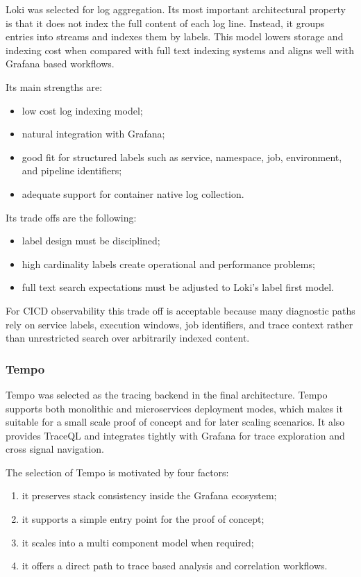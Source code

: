 Loki was selected for log aggregation. Its most important architectural property is that it does not index the full content of each log line. Instead, it groups entries into streams and indexes them by labels. This model lowers storage and indexing cost when compared with full text indexing systems and aligns well with Grafana based workflows.

Its main strengths are:
\begin{itemize}
    \item low cost log indexing model;
    \item natural integration with Grafana;
    \item good fit for structured labels such as service, namespace, job, environment, and pipeline identifiers;
    \item adequate support for container native log collection.
\end{itemize}

Its trade offs are the following:
\begin{itemize}
    \item label design must be disciplined;
    \item high cardinality labels create operational and performance problems;
    \item full text search expectations must be adjusted to Loki's label first model.
\end{itemize}

For \gls{CICD} observability this trade off is acceptable because many diagnostic paths rely on service labels, execution windows, job identifiers, and trace context rather than unrestricted search over arbitrarily indexed content.

\subsubsection{Tempo}
\label{subsubsec:tempo}

Tempo was selected as the tracing backend in the final architecture. Tempo supports both monolithic and microservices deployment modes, which makes it suitable for a small scale proof of concept and for later scaling scenarios. It also provides TraceQL and integrates tightly with Grafana for trace exploration and cross signal navigation.

The selection of Tempo is motivated by four factors:
\begin{enumerate}
    \item it preserves stack consistency inside the Grafana ecosystem;
    \item it supports a simple entry point for the proof of concept;
    \item it scales into a multi component model when required;
    \item it offers a direct path to trace based analysis and correlation workflows.
\end{enumerate}

